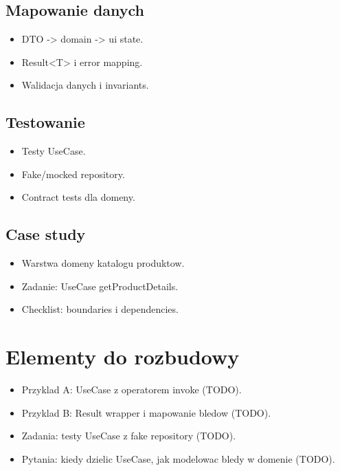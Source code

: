 \subsection{Mapowanie danych}
\begin{itemize}
  \item DTO -> domain -> ui state.
  \item Result<T> i error mapping.
  \item Walidacja danych i invariants.
\end{itemize}

\subsection{Testowanie}
\begin{itemize}
  \item Testy UseCase.
  \item Fake/mocked repository.
  \item Contract tests dla domeny.
\end{itemize}

\subsection{Case study}
\begin{itemize}
  \item Warstwa domeny katalogu produktow.
  \item Zadanie: UseCase getProductDetails.
  \item Checklist: boundaries i dependencies.
\end{itemize}

\section{Elementy do rozbudowy}
\begin{itemize}
  \item Przyklad A: UseCase z operatorem invoke (TODO).
  \item Przyklad B: Result wrapper i mapowanie bledow (TODO).
  \item Zadania: testy UseCase z fake repository (TODO).
  \item Pytania: kiedy dzielic UseCase, jak modelowac bledy w domenie (TODO).
\end{itemize}

